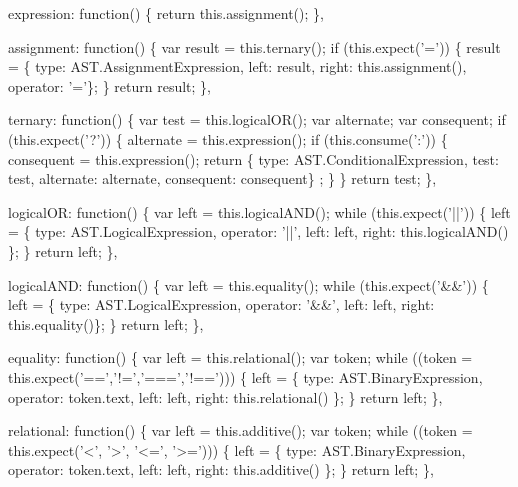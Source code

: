 \begin{DoxyCodeInclude}
{{  expression: \textcolor{keyword}{function}() \{
    \textcolor{keywordflow}{return} this.assignment();
  \},

  assignment: \textcolor{keyword}{function}() \{
    var result = this.ternary();
    \textcolor{keywordflow}{if} (this.expect(\textcolor{charliteral}{'='})) \{
      result = \{ type: AST.AssignmentExpression, left: result, right: this.assignment(), \textcolor{keyword}{operator}: \textcolor{charliteral}{'='}\};
    \}
    \textcolor{keywordflow}{return} result;
  \},

  ternary: \textcolor{keyword}{function}() \{
    var test = this.logicalOR();
    var alternate;
    var consequent;
    \textcolor{keywordflow}{if} (this.expect(\textcolor{charliteral}{'?'})) \{
      alternate = this.expression();
      \textcolor{keywordflow}{if} (this.consume(\textcolor{charliteral}{':'})) \{
        consequent = this.expression();
        \textcolor{keywordflow}{return} \{ type: AST.ConditionalExpression, test: test, alternate: alternate, consequent: consequent\}
      ;
      \}
    \}
    \textcolor{keywordflow}{return} test;
  \},

  logicalOR: \textcolor{keyword}{function}() \{
    var left = this.logicalAND();
    \textcolor{keywordflow}{while} (this.expect(\textcolor{stringliteral}{'||'})) \{
      left = \{ type: AST.LogicalExpression, \textcolor{keyword}{operator}: \textcolor{stringliteral}{'||'}, left: left, right: this.logicalAND() \};
    \}
    \textcolor{keywordflow}{return} left;
  \},

  logicalAND: \textcolor{keyword}{function}() \{
    var left = this.equality();
    \textcolor{keywordflow}{while} (this.expect(\textcolor{stringliteral}{'&&'})) \{
      left = \{ type: AST.LogicalExpression, \textcolor{keyword}{operator}: \textcolor{stringliteral}{'&&'}, left: left, right: this.equality()\};
    \}
    \textcolor{keywordflow}{return} left;
  \},

  equality: \textcolor{keyword}{function}() \{
    var left = this.relational();
    var token;
    \textcolor{keywordflow}{while} ((token = this.expect(\textcolor{stringliteral}{'=='},\textcolor{stringliteral}{'!='},\textcolor{stringliteral}{'==='},\textcolor{stringliteral}{'!=='}))) \{
      left = \{ type: AST.BinaryExpression, \textcolor{keyword}{operator}: token.text, left: left, right: this.relational() \};
    \}
    \textcolor{keywordflow}{return} left;
  \},

  relational: \textcolor{keyword}{function}() \{
    var left = this.additive();
    var token;
    \textcolor{keywordflow}{while} ((token = this.expect(\textcolor{charliteral}{'<'}, \textcolor{charliteral}{'>'}, \textcolor{stringliteral}{'<='}, \textcolor{stringliteral}{'>='}))) \{
      left = \{ type: AST.BinaryExpression, \textcolor{keyword}{operator}: token.text, left: left, right: this.additive() \};
    \}
    \textcolor{keywordflow}{return} left;
  \},

}}
\end{DoxyCodeInclude}
